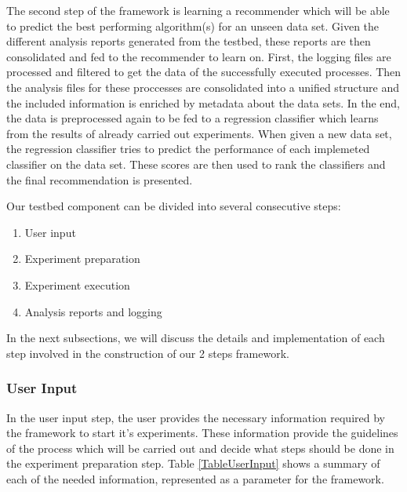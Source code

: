 The second step of the framework is learning a recommender which will be able to predict the best performing algorithm(s) for an unseen data set.
Given the different analysis reports generated from the testbed, these reports are then consolidated and fed to the recommender to learn on.
First, the logging files are processed and filtered to get the data of the successfully executed processes.
Then the analysis files for these proccesses are consolidated into a unified structure and the included information is enriched by metadata about the data sets.
In the end, the data is preprocessed again to be fed to a regression classifier which learns from the results of already carried out experiments.
When given a new data set, the regression classifier tries to predict the performance of each implemeted classifier on the data set.
These scores are then used to rank the classifiers and the final recommendation is presented.

Our testbed component can be divided into several consecutive steps:
\begin{enumerate}
    \item User input
    \item Experiment preparation
    \item Experiment execution
    \item Analysis reports and logging
\end{enumerate}

In the next subsections, we will discuss the details and implementation of each step involved in the construction of our 2 steps framework.

\subsubsection{User Input}
\label{SubsectionUserInput}
In the user input step, the user provides the necessary information required by the framework to start it's experiments.
These information provide the guidelines of the process which will be carried out and decide what steps should be done in the
experiment preparation step.
Table \ref{TableUserInput} shows a summary of each of the needed information, represented as a parameter for the framework.

